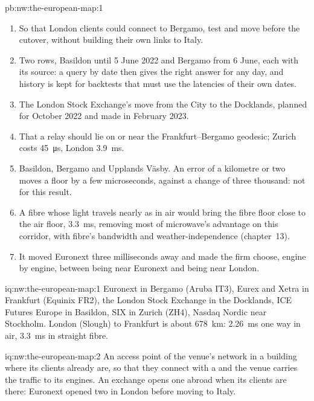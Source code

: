 \begin{solution}{pb:nw:the-european-map:1}
\begin{enumerate}[resume]
  \qty{3.31}{\milli\second} in vacuum (\qty{+3.05}{\milli\second}) and from 0.38 to \qty{4.84}{\milli\second} in fibre
  (\qty{+4.46}{\milli\second}); the London--Frankfurt--Euronext triangle went from 678, 603 and \qty{77}{\kilo\metre} to 678, 498 and
  \qty{992}{\kilo\metre}.
\item So that London clients could connect to Bergamo, test and move before the cutover, without building their own links to Italy.
\item Two rows, Basildon until 5 June 2022 and Bergamo from 6 June, each with its source: a query by date then gives the right answer for any
  day, and history is kept for backtests that must use the latencies of their own dates.
\item The London Stock Exchange's move from the City to the Docklands, planned for October 2022 and made in February 2023.
\item That a relay should lie on or near the Frankfurt--Bergamo geodesic; Zurich costs \qty{45}{\micro\second}, London \qty{3.9}{\milli\second}.
\item Basildon, Bergamo and Upplands Väsby. An error of a kilometre or two moves a floor by a few microseconds, against a change of three
  thousand: not for this result.
\item A fibre whose light travels nearly as in air would bring the fibre floor close to the air floor, \qty{3.3}{\milli\second}, removing most of
  microwave's advantage on this corridor, with fibre's bandwidth and weather-independence (chapter~13).
\item It moved Euronext three milliseconds away and made the firm choose, engine by engine, between being near Euronext and being near London.
\end{enumerate}
\end{solution}

\begin{solution}{iq:nw:the-european-map:1}
Euronext in Bergamo (Aruba IT3), Eurex and Xetra in Frankfurt (Equinix FR2), the London Stock Exchange in the Docklands, ICE Futures Europe in
Basildon, SIX in Zurich (ZH4), Nasdaq Nordic near Stockholm. London (Slough) to Frankfurt is about \qty{678}{\kilo\metre}: \qty{2.26}{\milli\second}
one way in air, \qty{3.3}{\milli\second} in straight fibre.
\end{solution}

\begin{solution}{iq:nw:the-european-map:2}
An access point of the venue's network in a building where its clients already are, so that they connect with a  and the venue
carries the traffic to its engines. An exchange opens one abroad when its clients are there: Euronext opened two in London before moving to
Italy.
\end{solution}

